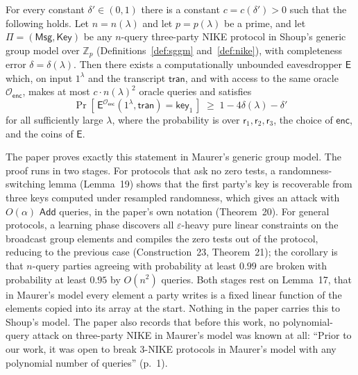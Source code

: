 \documentclass{conjura-conjecture}
\newcommand{\Zp}{\mathbb{Z}_{p}}
\newcommand{\enc}{\mathsf{enc}}
\newcommand{\Add}{\mathsf{Add}}
\newcommand{\Oenc}{\mathcal{O}_{\enc}}
\newcommand{\Msg}{\mathsf{Msg}}
\newcommand{\Key}{\mathsf{Key}}
\newcommand{\tran}{\mathsf{tran}}
\newcommand{\keyv}{\mathsf{key}}
\newcommand{\rv}{\mathsf{r}}
\newcommand{\Ev}{\mathsf{E}}
\begin{document}
\begin{conjecture}\label{conj:main}
For every constant $\delta' \in (0,1)$ there is a constant
$c = c(\delta') > 0$ such that the following holds. Let $n = n(\lambda)$
and let $p = p(\lambda)$ be a prime, and let $\Pi = (\Msg, \Key)$ be any
$n$-query three-party NIKE protocol in Shoup's generic group model over
$\Zp$ (Definitions~\ref{def:sggm} and~\ref{def:nike}), with completeness
error $\delta = \delta(\lambda)$. Then there exists a computationally
unbounded eavesdropper $\Ev$ which, on input $1^{\lambda}$ and the
transcript $\tran$, and with access to the same oracle $\Oenc$, makes at
most $c \cdot n(\lambda)^{2}$ oracle queries and satisfies
\[
  \Pr\!\left[\, \Ev^{\Oenc}(1^{\lambda}, \tran) = \keyv_{1} \,\right]
  \;\ge\; 1 - 4\delta(\lambda) - \delta'
\]
for all sufficiently large $\lambda$, where the probability is over
$\rv_{1}, \rv_{2}, \rv_{3}$, the choice of $\enc$, and the coins
of $\Ev$.
\end{conjecture}

\begin{remark}\label{rem:progress}
The paper proves exactly this statement in Maurer's generic group model.
The proof runs in two stages. For protocols that ask no zero tests, a
randomness-switching lemma (Lemma~19) shows that the first party's key
is recoverable from three keys computed under resampled randomness,
which gives an attack with $O(\alpha)$ $\Add$ queries, in the paper's
own notation (Theorem~20). For general protocols, a learning phase
discovers all $\varepsilon$-heavy pure linear constraints on the
broadcast group elements and compiles the zero tests out of the
protocol, reducing to the previous case (Construction~23,
Theorem~21); the corollary is that
$n$-query parties agreeing with probability at least $0.99$ are broken
with probability at least $0.95$ by $O(n^{2})$ queries. Both stages rest
on Lemma~17, that in Maurer's model every element a party writes is a
fixed linear function of the elements copied into its array at the
start. Nothing in the paper carries this to Shoup's model. The paper
also records that before this work, no polynomial-query attack on
three-party NIKE in Maurer's model was known at all: ``Prior to our
work, it was open to break 3-NIKE protocols in Maurer's model with any
polynomial number of queries'' (p.~1).
\end{remark}
\end{document}
